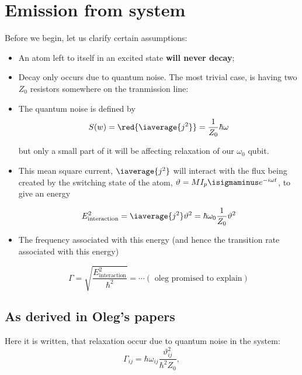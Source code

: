 \section{Emission from system} 
 Before we begin, let us clarify certain assumptions:
 \begin{itemize}
 	\item An atom left to itself in an excited state \textbf{will never decay};
 	\item Decay only occurs due to quantum noise. The most trivial case, is having two $ Z_0 $ resistors somewhere on the tranmission line:
 	
 	
 	\item  The quantum noise \textbf{} is defined by
 	\begin{equation}\label{key}
 		S(w) = \red{\iaverage{j^2}} = \frac{1}{Z_0}\hbar\omega
 	\end{equation}
 	
 	\noindent but only a small part of it will be affecting relaxation of our $ \omega_0 $ qubit.
 	
 	
	\item This mean square current, $ \iaverage{j^2} $ will interact with the flux being created by the switching state of the atom, $ \vartheta = MI_p\isigmaminus e^{-i\omega t} $, to give an energy
	
	\begin{equation}\label{key}
		E_\text{interaction}^2 = \iaverage{j^2}\vartheta^2 = \hbar\omega_0\frac{1}{Z_0}\vartheta^2
	\end{equation}
	
	\item The frequency associated with this energy (and hence the transition rate associated with this energy)
	
	\begin{equation}\label{key}
		\Gamma = \sqrt{\frac{E_\text{interaction}^2}{\hbar^2}} = \cdots (\text{ oleg promised to explain})
	\end{equation}
 \end{itemize} 

 \subsection{As derived in Oleg's papers \cite{abdumalikov2010}\cite{Astafiev2010}}
Here it is written, that relaxation occur due to quantum noise in the system:
\begin{equation}\label{key}
\Gamma_{ij} = \hbar\omega_{ij}\frac{\vartheta_{ij}^2}{\hbar^2Z_0},
\end{equation}

